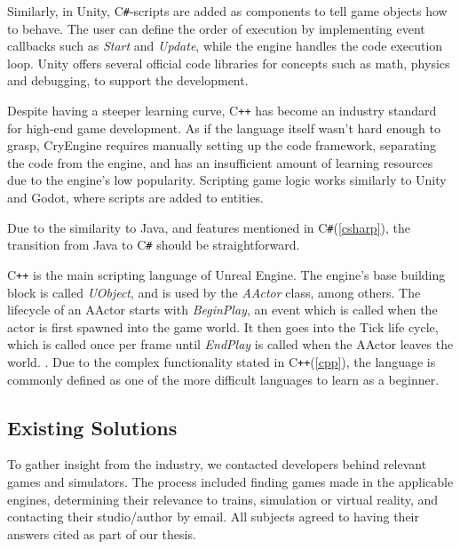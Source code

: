 Similarly, in Unity, C\texttt{\#}-scripts are added as components to tell game objects how to behave. The user can define the order of execution by implementing event callbacks such as \textit{Start} and \textit{Update}, while the engine handles the code execution loop. Unity offers several official code libraries for concepts such as math, physics and debugging, to support the development. 

Despite having a steeper learning curve, C\texttt{++} has become an industry standard for high-end game development. As if the language itself wasn't hard enough to grasp, CryEngine requires manually setting up the code framework, separating the code from the engine, and has an insufficient amount of learning resources due to the engine's low popularity. Scripting game logic works similarly to Unity and Godot, where scripts are added to entities.

Due to the similarity to Java, and features mentioned in C\texttt{\#}(\ref{csharp}), the transition from Java to C\texttt{\#} should be straightforward.   

C\texttt{++} is the main scripting language of Unreal Engine. The engine's base building block is called \textit{UObject}, and is used by the \textit{AActor} class, among others. The lifecycle of an AActor starts with \textit{BeginPlay}, an event which is called when the actor is first spawned into the game world. It then goes into the Tick life cycle, which is called once per frame until \textit{EndPlay} is called when the AActor leaves the world. \cite{unreal_engine_documentation_2021}. Due to the complex functionality stated in C\texttt{++}(\ref{cpp}), the language is commonly defined as one of the more difficult languages to learn as a beginner.

 








\subsection{Existing Solutions}

To gather insight from the industry, we contacted developers behind relevant games and simulators. The process included finding games made in the applicable engines, determining their relevance to trains, simulation or virtual reality, and contacting their studio/author by email. All subjects agreed to having their answers cited as part of our thesis.

